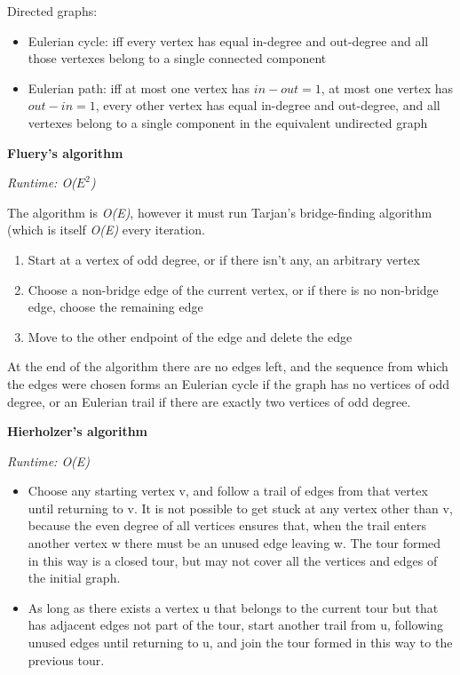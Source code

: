 Directed graphs:
\begin{itemize}
    \item Eulerian cycle: iff every vertex has equal in-degree and out-degree and all those vertexes belong to a single connected component
    \item Eulerian path: iff at most one vertex has $in - out = 1$, at most one vertex has $out - in = 1$, every other vertex has equal in-degree and out-degree, and all vertexes belong to a single component in the equivalent undirected graph
\end{itemize}

\textbf{Fluery's algorithm}

\textit{Runtime: O($E^2$)}

The algorithm is \textit{O(E)}, however it must run Tarjan's bridge-finding algorithm (which is itself \textit{O(E)} every iteration.

\begin{enumerate}
    \item Start at a vertex of odd degree, or if there isn't any, an arbitrary vertex
    \item Choose a non-bridge edge of the current vertex, or if there is no non-bridge edge, choose the remaining edge
    \item Move to the other endpoint of the edge and delete the edge
\end{enumerate}

At the end of the algorithm there are no edges left, and the sequence from which the edges were chosen forms an Eulerian cycle if the graph has no vertices of odd degree, or an Eulerian trail if there are exactly two vertices of odd degree.

\textbf{Hierholzer's algorithm}

\textit{Runtime: O(E)}

\begin{itemize}
    \item Choose any starting vertex v, and follow a trail of edges from that vertex until returning to v. It is not possible to get stuck at any vertex other than v, because the even degree of all vertices ensures that, when the trail enters another vertex w there must be an unused edge leaving w. The tour formed in this way is a closed tour, but may not cover all the vertices and edges of the initial graph.
    \item As long as there exists a vertex u that belongs to the current tour but that has adjacent edges not part of the tour, start another trail from u, following unused edges until returning to u, and join the tour formed in this way to the previous tour.
\end{itemize}

